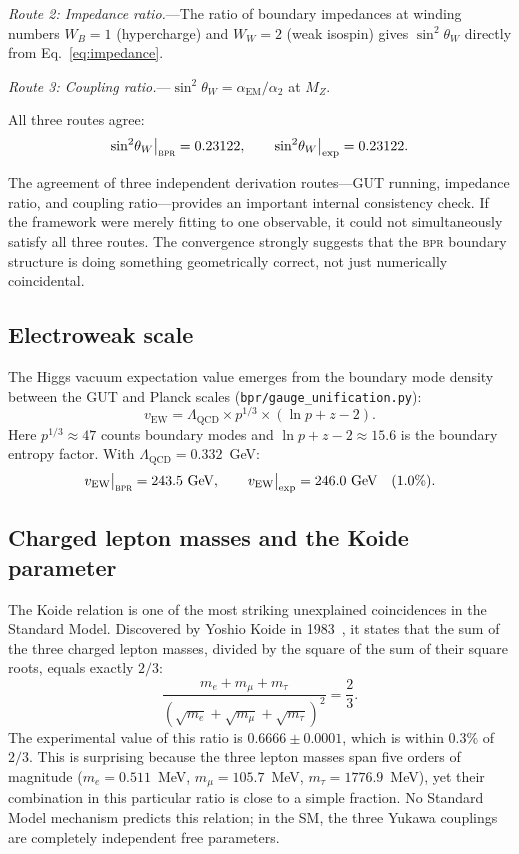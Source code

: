 \documentclass[aps,prd,twocolumn,superscriptaddress,longbibliography,nofootinbib]{revtex4-2}
\newcommand{\vEW}{v_{\mathrm{EW}}}
\newcommand{\sinW}{\sin^2\!\theta_W}
\newcommand{\alphaEM}{\alpha_{\mathrm{EM}}}
\newcommand{\LQCD}{\Lambda_{\mathrm{QCD}}}
\newcommand{\MZ}{M_Z}
\newcommand{\bpr}{\textsc{bpr}}
\begin{document}
\textit{Route 2: Impedance ratio.}---The ratio of boundary
impedances at winding numbers $W_B = 1$ (hypercharge) and $W_W = 2$
(weak isospin) gives $\sinW$ directly from
Eq.~\eqref{eq:impedance}.

\textit{Route 3: Coupling ratio.}---$\sinW =
\alphaEM / \alpha_2$ at $\MZ$.

All three routes agree:
\begin{equation}
\sinW\big|_{\bpr} = 0.23122, \qquad
\sinW\big|_{\mathrm{exp}} = 0.23122.
\label{eq:weinberg_value}
\end{equation}

The agreement of three independent derivation routes---GUT running,
impedance ratio, and coupling ratio---provides an important
internal consistency check.  If the framework were merely fitting to
one observable, it could not simultaneously satisfy all three
routes.  The convergence strongly suggests that the \bpr{} boundary
structure is doing something geometrically correct, not just
numerically coincidental.

\subsection{Electroweak scale}

The Higgs vacuum expectation value emerges from the boundary mode
density between the GUT and Planck scales
(\texttt{bpr/gauge\_unification.py}):
\begin{equation}
\vEW = \LQCD \times p^{1/3} \times (\ln p + z - 2).
\label{eq:vew}
\end{equation}
Here $p^{1/3} \approx 47$ counts boundary modes and
$\ln p + z - 2 \approx 15.6$ is the boundary entropy factor.  With
$\LQCD = 0.332$~GeV:
\begin{equation}
\vEW\big|_{\bpr} = 243.5~\text{GeV}, \qquad
\vEW\big|_{\mathrm{exp}} = 246.0~\text{GeV} \quad (1.0\%).
\label{eq:vew_value}
\end{equation}

\subsection{Charged lepton masses and the Koide parameter}

The Koide relation is one of the most striking unexplained
coincidences in the Standard Model.  Discovered by Yoshio Koide in
1983~\cite{Koide1983}, it states that the sum of the three charged
lepton masses, divided by the square of the sum of their square roots,
equals exactly $2/3$:
\begin{equation}
\frac{m_e + m_\mu + m_\tau}
  {(\sqrt{m_e} + \sqrt{m_\mu} + \sqrt{m_\tau})^2} = \frac{2}{3}.
\label{eq:koide_original}
\end{equation}
The experimental value of this ratio is $0.6666 \pm 0.0001$, which
is within $0.3\%$ of $2/3$.  This is surprising because the three
lepton masses span five orders of magnitude ($m_e = 0.511$~MeV,
$m_\mu = 105.7$~MeV, $m_\tau = 1776.9$~MeV), yet their combination
in this particular ratio is close to a simple fraction.  No
Standard Model mechanism predicts this relation; in the SM, the three
Yukawa couplings are completely independent free parameters.
\end{document}
